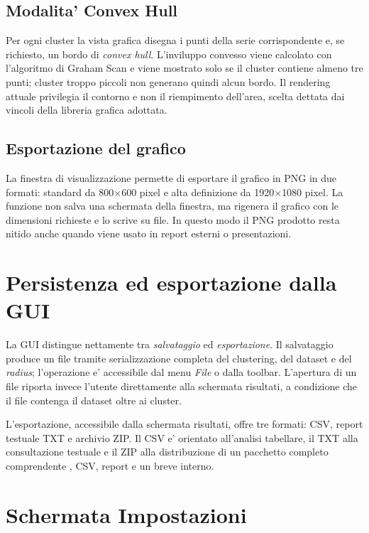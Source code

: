 \subsection{Modalita' Convex Hull}

Per ogni cluster la vista grafica disegna i punti della serie corrispondente e, se
richiesto, un bordo di \emph{convex hull}. L'inviluppo convesso viene calcolato con
l'algoritmo di Graham Scan e viene mostrato solo se il cluster contiene almeno tre punti;
cluster troppo piccoli non generano quindi alcun bordo. Il rendering attuale privilegia
il contorno e non il riempimento dell'area, scelta dettata dai vincoli della libreria
grafica adottata.

\subsection{Esportazione del grafico}

La finestra di visualizzazione permette di esportare il grafico in PNG in due formati:
standard da 800$\times$600 pixel e alta definizione da 1920$\times$1080 pixel. La
funzione non salva una schermata della finestra, ma rigenera il grafico con le dimensioni
richieste e lo scrive su file. In questo modo il PNG prodotto resta nitido anche quando
viene usato in report esterni o presentazioni.

\section{Persistenza ed esportazione dalla GUI}

La GUI distingue nettamente tra \emph{salvataggio} ed \emph{esportazione}. Il salvataggio
produce un file  tramite serializzazione completa del clustering, del
dataset e del \emph{radius}; l'operazione e' accessibile dal menu \emph{File} o dalla
toolbar. L'apertura di un file  riporta invece l'utente direttamente alla
schermata risultati, a condizione che il file contenga il dataset oltre ai cluster.

L'esportazione, accessibile dalla schermata risultati, offre tre formati: CSV, report
testuale TXT e archivio ZIP. Il CSV e' orientato all'analisi tabellare, il TXT alla
consultazione testuale e il ZIP alla distribuzione di un pacchetto completo comprendente
, CSV, report e un breve  interno.

\section{Schermata Impostazioni}

